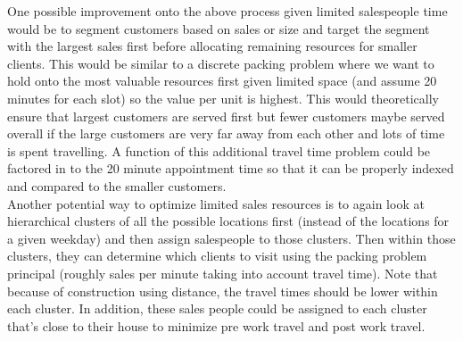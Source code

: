 \documentclass{article}
\begin{document}
One possible improvement onto the above process given limited salespeople time would be to segment customers based on sales or size and target the segment with the largest sales first before allocating remaining resources for smaller clients.  This would be similar to a discrete packing problem where we want to hold onto the most valuable resources first given limited space (and assume 20 minutes for each slot) so the value per unit is highest. This would theoretically ensure that largest customers are served first but fewer customers maybe served overall if the large customers are very far away from each other and lots of time is spent travelling.  A function of this additional travel time problem could be factored in to the 20 minute appointment time so that it can be properly indexed and compared to the smaller customers.\\

Another potential way to optimize limited sales resources is to again look at hierarchical clusters of all the possible locations first (instead of the locations for a given weekday) and then assign salespeople to those clusters.  Then within those clusters, they can determine which clients to visit using the packing problem principal (roughly sales per minute taking into account travel time).  Note that because of construction using distance, the travel times should be lower within each cluster.  In addition, these sales people could be assigned to each cluster that's close to their house to minimize pre work travel and post work travel.\\ 
\end{document}
